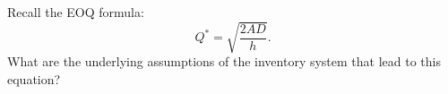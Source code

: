 \begin{exercise}\label{ex:1}
  Recall the EOQ formula:
  \begin{equation*}
    Q^* = \sqrt{\frac{ 2 A D}{h}}.
  \end{equation*}
What are the underlying assumptions of the inventory system that lead to this equation?

\end{exercise}

